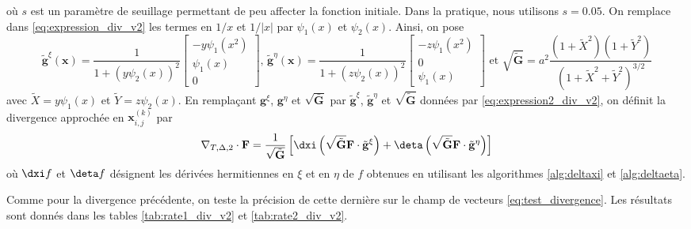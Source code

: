 où $s$ est un paramètre de seuillage permettant de peu affecter la fonction initiale. Dans la pratique, nous utilisons $s=0.05$. On remplace dans \eqref{eq:expression_div_v2} les termes en $1/x$ et $1/|x|$ par $\psi_1(x)$ et $\psi_2(x)$. Ainsi, on pose
\begin{equation}
\tilde{\mathbf{g}}^{\xi} (\mathbf{x} ) = \dfrac{1}{1 + (y\psi_2(x))^2} \begin{bmatrix}
- y\psi_1(x^2) \\
\psi_1(x) \\
0
\end{bmatrix} \text{, }
\tilde{\mathbf{g}}^{\eta} (\mathbf{x} ) = \dfrac{1}{1 + (z\psi_2(x))^2} \begin{bmatrix}
- z\psi_1(x^2) \\
0 \\
\psi_1(x)
\end{bmatrix}
 \text{ et } \sqrt{\tilde{\mathbf{G}}} = a^2 \dfrac{(1+\tilde{X}^2)(1+ \tilde{Y}^2)}{(1+\tilde{X}^2+\tilde{Y}^2)^{3/2}}
\label{eq:expression2_div_v2}
\end{equation}
avec $\tilde{X}=y \psi_1(x)$ et $\tilde{Y} = z \psi_2(x)$.
En remplaçant $\mathbf{g}^{\xi}$, $\mathbf{g}^{\eta}$ et $\sqrt{\bar{\mathbf{G}}}$ par $\tilde{\mathbf{g}}^{\xi}$, $\tilde{\mathbf{g}}^{\eta}$ et $\sqrt{\tilde{\mathbf{G}}}$ données par \eqref{eq:expression2_div_v2}, on définit la divergence approchée en $\mathbf{x}_{i,j}^{(k)}$ par
\begin{equation}
\nabla_{T,\Delta,2} \cdot \mathbf{F} = \dfrac{1}{\sqrt{\tilde{\mathbf{G}}}} \left[ \dxi \left( \sqrt{\tilde{\mathbf{G}}} \mathbf{F} \cdot \tilde{\mathbf{g}}^{\xi} \right) + 
\deta \left( \sqrt{\tilde{\mathbf{G}}} \mathbf{F} \cdot \tilde{\mathbf{g}}^{\eta} \right)
\right]
\end{equation}
où $\dxi f$ et $\deta f$ désignent les dérivées hermitiennes en $\xi$ et en $\eta$ de $f$ obtenues en utilisant les algorithmes \ref{alg:deltaxi} et \ref{alg:deltaeta}. 

Comme pour la divergence précédente, on teste la précision de cette dernière sur le champ de vecteurs \eqref{eq:test_divergence}. Les résultats sont donnés dans les tables \ref{tab:rate1_div_v2} et \ref{tab:rate2_div_v2}.

